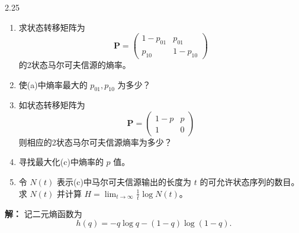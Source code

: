 \documentclass[UTF8,11pt,a4paper]{ctexart}
\begin{document}
\vspace{0.8em}

\begin{problem}{2.25}
\begin{enumerate}[label=\textnormal{(\alph*)}]
  \item 求状态转移矩阵为
  \[
  \boldsymbol{P} = \begin{pmatrix}
  1 - p_{01} & p_{01} \\
  p_{10} & 1 - p_{10}
  \end{pmatrix}
  \]
  的2状态马尔可夫信源的熵率。

  \item 使(a)中熵率最大的 $p_{01}, p_{10}$ 为多少？

  \item 如状态转移矩阵为
  \[
  \boldsymbol{P} = \begin{pmatrix}
  1 - p & p \\
  1 & 0
  \end{pmatrix}
  \]
  则相应的2状态马尔可夫信源熵率为多少？

  \item 寻找最大化(c)中熵率的 $p$ 值。

  \item 令 $N(t)$ 表示(c)中马尔可夫信源输出的长度为 $t$ 的可允许状态序列的数目。求 $N(t)$ 并计算 $H = \lim_{t \to \infty} \frac{1}{t} \log N(t)$。
\end{enumerate}
\end{problem}
\noindent\textbf{解：}
记二元熵函数为
\[
h(q)=-q\log q-(1-q)\log(1-q).
\]
\end{document}
